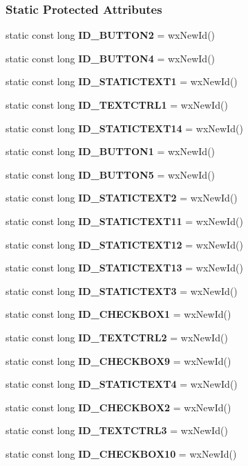 \subsubsection*{Static Protected Attributes}
\begin{DoxyCompactItemize}
\item 
static const long {\bf I\+D\+\_\+\+B\+U\+T\+T\+O\+N2} = wx\+New\+Id()
\item 
static const long {\bf I\+D\+\_\+\+B\+U\+T\+T\+O\+N4} = wx\+New\+Id()
\item 
static const long {\bf I\+D\+\_\+\+S\+T\+A\+T\+I\+C\+T\+E\+X\+T1} = wx\+New\+Id()
\item 
static const long {\bf I\+D\+\_\+\+T\+E\+X\+T\+C\+T\+R\+L1} = wx\+New\+Id()
\item 
static const long {\bf I\+D\+\_\+\+S\+T\+A\+T\+I\+C\+T\+E\+X\+T14} = wx\+New\+Id()
\item 
static const long {\bf I\+D\+\_\+\+B\+U\+T\+T\+O\+N1} = wx\+New\+Id()
\item 
static const long {\bf I\+D\+\_\+\+B\+U\+T\+T\+O\+N5} = wx\+New\+Id()
\item 
static const long {\bf I\+D\+\_\+\+S\+T\+A\+T\+I\+C\+T\+E\+X\+T2} = wx\+New\+Id()
\item 
static const long {\bf I\+D\+\_\+\+S\+T\+A\+T\+I\+C\+T\+E\+X\+T11} = wx\+New\+Id()
\item 
static const long {\bf I\+D\+\_\+\+S\+T\+A\+T\+I\+C\+T\+E\+X\+T12} = wx\+New\+Id()
\item 
static const long {\bf I\+D\+\_\+\+S\+T\+A\+T\+I\+C\+T\+E\+X\+T13} = wx\+New\+Id()
\item 
static const long {\bf I\+D\+\_\+\+S\+T\+A\+T\+I\+C\+T\+E\+X\+T3} = wx\+New\+Id()
\item 
static const long {\bf I\+D\+\_\+\+C\+H\+E\+C\+K\+B\+O\+X1} = wx\+New\+Id()
\item 
static const long {\bf I\+D\+\_\+\+T\+E\+X\+T\+C\+T\+R\+L2} = wx\+New\+Id()
\item 
static const long {\bf I\+D\+\_\+\+C\+H\+E\+C\+K\+B\+O\+X9} = wx\+New\+Id()
\item 
static const long {\bf I\+D\+\_\+\+S\+T\+A\+T\+I\+C\+T\+E\+X\+T4} = wx\+New\+Id()
\item 
static const long {\bf I\+D\+\_\+\+C\+H\+E\+C\+K\+B\+O\+X2} = wx\+New\+Id()
\item 
static const long {\bf I\+D\+\_\+\+T\+E\+X\+T\+C\+T\+R\+L3} = wx\+New\+Id()
\item 
static const long {\bf I\+D\+\_\+\+C\+H\+E\+C\+K\+B\+O\+X10} = wx\+New\+Id()

\end{DoxyCompactItemize}
